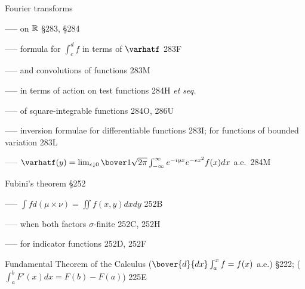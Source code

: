Fourier transforms

----- on $\Bbb R$ \S283, \S284



----- formula for $\int_c^df$ in terms of $\varhatf$ 283F

----- and convolutions of functions 283M




----- in terms of action on test functions 284H {\it et seq.}

----- of square-integrable functions 284O, 286U


----- inversion formulae for differentiable functions 283I;
for functions of bounded variation 283L


----- $\varhatf(y)=\lim_{\epsilon\downarrow 0}
  \bover1{\sqrt{2\pi}}\int_{-\infty}^{\infty}
  e^{-iyx}e^{-\epsilon x^2}f(x)dx$ a.e.\ 284M



















Fubini's theorem \S252

----- $\int fd(\mu\times\nu)=\iint f(x,y)dxdy$ 252B

----- when both factors $\sigma$-finite 252C, 252H

----- for indicator functions 252D, 252F





Fundamental Theorem of the Calculus ($\bover{d}{dx}\int_a^xf=f(x)$
a.e.) \S222; 
  ($\int_a^bF'(x)dx=F(b)-F(a)$) 225E


\indexmedskip
















\indexmedskip




















